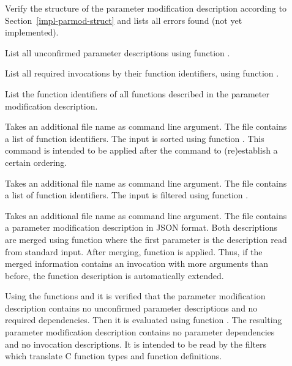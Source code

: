 \begin{description}

\item[]
Verify the structure of the parameter modification description 
according to Section~\ref{impl-parmod-struct} and lists all errors found (not yet implemented).

\item[] 
List all unconfirmed parameter descriptions using function .

\item[]
List all required invocations by their function identifiers, using function .

\item[]
List the function identifiers of all functions described in the parameter modification description.

\item[]
Takes an additional file name as command line argument. The file contains a list of function identifiers.
The input is sorted using function . This command
is intended to be applied after the  command to (re)establish a certain ordering.

\item[]
Takes an additional file name as command line argument. The file contains a list of function identifiers.
The input is filtered using function .

\item[]
Takes an additional file name as command line argument. The file contains a parameter modification description 
in JSON format. Both descriptions are merged using function 
where the first parameter is the description read from standard input.
After merging, function  is applied.
Thus, if the merged information contains
an invocation with more arguments than before, the function description is automatically extended.

\item[]
Using the functions  and  it is verified that the parameter modification 
description contains no
unconfirmed parameter descriptions and no required dependencies. Then it is evaluated using function .
The resulting parameter modification description contains no parameter dependencies and
no invocation descriptions. It is intended to be read by the filters which translate C function types and function 
definitions.
\end{description}

